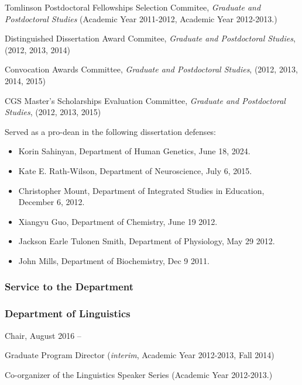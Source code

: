 \documentclass[11pt]{article}
\begin{document}
Tomlinson Postdoctoral Fellowships Selection Commitee, \textit{Graduate and
  Postdoctoral Studies} (Academic Year 2011-2012, Academic Year 2012-2013.)

Distinguished Dissertation Award Commitee, \textit{Graduate and
  Postdoctoral Studies}, (2012, 2013, 2014)

Convocation Awards Committee, \textit{Graduate and
  Postdoctoral Studies}, (2012, 2013, 2014, 2015)

CGS Master's Scholarships Evaluation Committee, \textit{Graduate and
  Postdoctoral Studies}, (2012, 2013, 2015)

Served as a pro-dean in the following dissertation defenses:

\begin{itemize}
  \item Korin Sahinyan, Department of Human Genetics, June 18, 2024.
\item Kate E. Rath-Wilson, Department of Neuroscience, July 6, 2015.
\item Christopher Mount, Department of Integrated Studies in
  Education, December 6, 2012.
\item Xiangyu Guo, Department of Chemistry, June 19 2012.
\item Jackson Earle Tulonen Smith, Department of Physiology, May 29 2012.
\item John Mills, Department of Biochemistry, Dec 9 2011.

\end{itemize}

\subsubsection*{Service to the Department}

\subsubsection*{Department of Linguistics}

Chair, August 2016 --

Graduate Program Director (\textit{interim}, Academic Year 2012-2013, Fall 2014)


Co-organizer of the Linguistics Speaker Series (Academic Year 2012-2013.)

\end{document}
